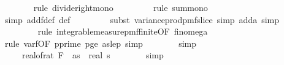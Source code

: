 \begin{isabellebody}
\ \ \ \ \ \ \isamarkupfalse%
\ {\isacharparenleft}{\kern0pt}rule\ divide{\isacharunderscore}{\kern0pt}right{\isacharunderscore}{\kern0pt}mono{\isacharparenright}{\kern0pt}\isanewline
\ \ \ \ \ \ \ \isamarkupfalse%
\ {\isacharparenleft}{\kern0pt}rule\ sum{\isacharunderscore}{\kern0pt}mono{\isacharparenright}{\kern0pt}\isanewline
\ \ \ \ \ \ \ \isamarkupfalse%
\ {\isacharparenleft}{\kern0pt}simp\ add{\isacharcolon}{\kern0pt}f{}{\isacharunderscore}{\kern0pt}def\ {\isasymOmega}def{\isacharparenright}{\kern0pt}\isanewline
\ \ \ \ \ \ \ \isamarkupfalse%
\ {\isacharparenleft}{\kern0pt}subst\ variance{\isacharunderscore}{\kern0pt}prod{\isacharunderscore}{\kern0pt}pmf{\isacharunderscore}{\kern0pt}slice{\isacharcomma}{\kern0pt}\ simp\ add{\isacharcolon}{\kern0pt}a{\isacharcomma}{\kern0pt}\ simp{\isacharparenright}{\kern0pt}\isanewline
\ \ \ \ \ \ \ \isamarkupfalse%
\ {\isacharparenleft}{\kern0pt}rule\ integrable{\isacharunderscore}{\kern0pt}measure{\isacharunderscore}{\kern0pt}pmf{\isacharunderscore}{\kern0pt}finite{\isacharbrackleft}{\kern0pt}OF\ fin{\isacharunderscore}{\kern0pt}omega{\isacharunderscore}{\kern0pt}{}{\isacharbrackright}{\kern0pt}{\isacharparenright}{\kern0pt}\isanewline
\ \ \ \ \ \ \ \isamarkupfalse%
\ {\isacharparenleft}{\kern0pt}rule\ var{\isacharunderscore}{\kern0pt}f{}{\isacharbrackleft}{\kern0pt}OF\ p{\isacharunderscore}{\kern0pt}prime\ p{\isacharunderscore}{\kern0pt}ge{\isacharunderscore}{\kern0pt}{}\ as{\isacharunderscore}{\kern0pt}le{\isacharunderscore}{\kern0pt}p{\isacharbrackright}{\kern0pt}{\isacharcomma}{\kern0pt}\ simp{\isacharparenright}{\kern0pt}\isanewline
\ \ \ \ \ \ \isamarkupfalse%
\ simp\isanewline
\ \ \ \ \isamarkupfalse%
\ \isamarkupfalse%
\ {\isachardoublequoteopen}{\isachardot}{\kern0pt}{\isachardot}{\kern0pt}{\isachardot}{\kern0pt}\ {\isacharequal}{\kern0pt}\ {}\ {\isacharasterisk}{\kern0pt}\ {\isacharparenleft}{\kern0pt}real{\isacharunderscore}{\kern0pt}of{\isacharunderscore}{\kern0pt}rat\ {\isacharparenleft}{\kern0pt}F\ {}\ as{\isacharparenright}{\kern0pt}{\isacharcircum}{\kern0pt}{}{\isacharparenright}{\kern0pt}\ {\isacharslash}{\kern0pt}\ real\ s\isanewline
\ \ \ \ \ \ \isamarkupfalse%
\ {\isacharparenleft}{\kern0pt}simp{\isacharparenright}{\kern0pt}\isanewline

\end{isabellebody}

